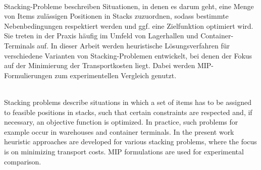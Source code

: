 \renewenvironment{abstract}
{\vspace*{\fill}
  {\bfseries\abstractname}\\[5mm]}
{\vfill}

\begin{abstract}

Stacking-Probleme beschreiben Situationen, in denen es darum geht, eine Menge von Items zulässigen Positionen in Stacks zuzuordnen, sodass bestimmte Nebenbedingungen respektiert werden und ggf. eine Zielfunktion optimiert wird. Sie treten in der Praxis häufig im Umfeld von Lagerhallen und Container-Terminals auf. In dieser Arbeit werden heuristische Lösungsverfahren für verschiedene Varianten von Stacking-Problemen entwickelt, bei denen der Fokus auf der Minimierung der Transportkosten liegt. Dabei werden MIP-Formulierungen zum experimentellen Vergleich genutzt.

\end{abstract}

\begin{abstract}

Stacking problems describe situations in which a set of items has to be assigned to feasible
positions in stacks, such that certain constraints are respected and, if necessary, an objective function is optimized.
In practice, such problems for example occur in warehouses and container terminals.
In the present work heuristic approaches are developed for various stacking problems, where the focus is on
minimizing transport costs. MIP formulations are used for experimental comparison.

\end{abstract}
